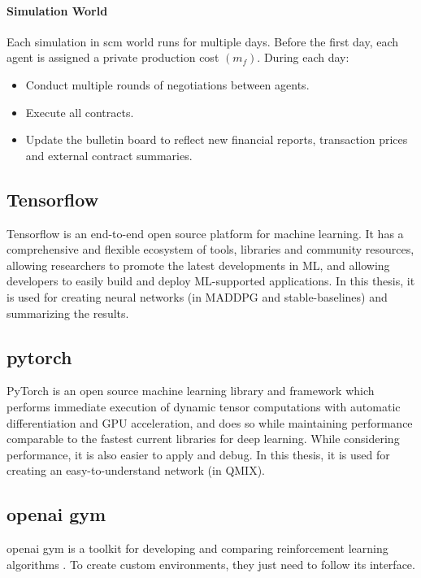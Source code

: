 \paragraph{Simulation World} Each simulation in \gls{scm} world runs for multiple days. Before the first day, each agent is assigned a private production cost $(m_f)$. During each day\parencite{Mohammad2021}:
\begin{itemize}
\item Conduct multiple rounds of negotiations between agents.
\item Execute all contracts.
\item Update the bulletin board to reflect new financial reports, transaction prices and external contract summaries.
\end{itemize}

\subsection{Tensorflow} Tensorflow is an end-to-end open source platform for machine learning. It has a comprehensive and flexible ecosystem of tools, libraries and community resources, allowing researchers to promote the latest developments in ML, and allowing developers to easily build and deploy ML-supported applications\parencite{tensorflow2015-whitepaper}. In this thesis, it is used for creating neural networks (in MADDPG and stable-baselines) and summarizing the results.

\subsection{\gls{pytorch}} PyTorch is an open source machine learning library and framework which performs immediate execution of dynamic tensor computations with automatic differentiation and GPU acceleration, and does so while maintaining performance comparable to the fastest current libraries for deep learning\parencite{NEURIPS2019_bdbca288}. While considering performance, it is also easier to apply and debug. In this thesis, it is used for creating an easy-to-understand network (in QMIX).

\subsection{\gls{openai gym}}
\gls{openai gym} is a toolkit for developing and comparing reinforcement learning algorithms \parencite{brockman2016openai}. To create custom environments, they just need to follow its interface.
